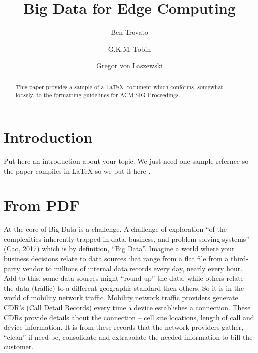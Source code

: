 \documentclass[sigconf]{acmart}
\begin{document}
\title{Big Data for Edge Computing}


\author{Ben Trovato}

\author{G.K.M. Tobin}

\author{Gregor von Laszewski}


\renewcommand{\shortauthors}{G. v. Laszewski}


\begin{abstract}
This paper provides a sample of a \LaTeX\ document which conforms,
somewhat loosely, to the formatting guidelines for
ACM SIG Proceedings.
\end{abstract}



\maketitle

\section{Introduction}

Put here an introduction about your topic. 
We just need one sample refernce so the paper compiles in LaTeX so we
put it here \cite{editor00}.


\section{From PDF}

At the core of Big Data is a challenge.  A challenge of exploration
“of the complexities inherently trapped in data, business, and
problem-solving systems'' (Cao, 2017) \cite{??} which is by definition, ``Big
Data''.  Imagine a world where your business decisions relate to data
sources that range from a flat file from a third-party vendor to
millions of internal data records every day, nearly every hour.  Add
to this, some data sources might ``round up'' the data, while others
relate the data (traffic) to a different geographic standard then
others.  So it is in the world of mobility network traffic.  Mobility
network traffic providers generate CDR’s \cite{??} (Call Detail Records) every
time a device establishes a connection.  These CDRs provide details
about the connection – cell site locations, length of call and device
information.  It is from these records that the network providers
gather, ``clean'' if need be, consolidate and extrapolate the needed
information to bill the customer.
\end{document}
